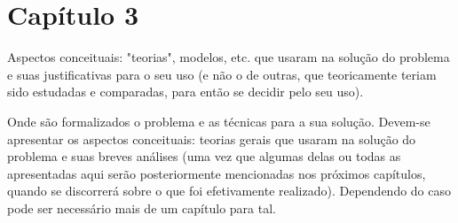 \chapter{Capítulo 3}

Aspectos conceituais: "teorias", modelos, etc. que usaram na solução do problema e suas justificativas  para  o  seu  uso  (e  não  o  de outras,  que  teoricamente  teriam  sido  estudadas  e comparadas, para então se decidir pelo seu uso).

Onde são formalizados o problema e as técnicas para a sua solução. Devem-se apresentar os aspectos conceituais: teorias gerais que usaram na solução do problema e suas breves análises (uma vez que algumas delas ou todas as apresentadas aqui serão posteriormente mencionadas nos próximos capítulos, quando se discorrerá sobre o que foi efetivamente realizado).
Dependendo do caso pode ser necessário mais de um capítulo para tal. 
